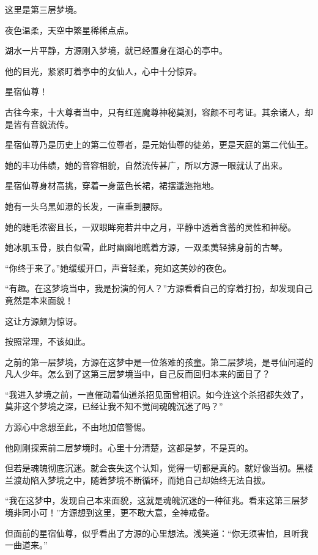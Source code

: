 
\begin{this_body}

这里是第三层梦境。

夜色温柔，天空中繁星稀稀点点。

湖水一片平静，方源刚入梦境，就已经置身在湖心的亭中。

他的目光，紧紧盯着亭中的女仙人，心中十分惊异。

星宿仙尊！

古往今来，十大尊者当中，只有红莲魔尊神秘莫测，容颜不可考证。其余诸人，却是皆有音貌流传。

星宿仙尊乃是历史上的第二位尊者，是元始仙尊的徒弟，更是天庭的第二代仙王。

她的丰功伟绩，她的音容相貌，自然流传甚广，所以方源一眼就认了出来。

星宿仙尊身材高挑，穿着一身蓝色长裙，裙摆逶迤拖地。

她有一头乌黑如瀑的长发，一直垂到腰际。

她的睫毛浓密且长，一双眼眸宛若井中之月，平静中透着含蓄的灵性和神秘。

她冰肌玉骨，肤白似雪，此时幽幽地瞧着方源，一双柔荑轻拂身前的古琴。

“你终于来了。”她缓缓开口，声音轻柔，宛如这美妙的夜色。

“有趣。在这梦境当中，我是扮演的何人？”方源看看自己的穿着打扮，却发现自己竟然是本来面貌！

这让方源颇为惊讶。

按照常理，不该如此。

之前的第一层梦境，方源在这梦中是一位落难的孩童。第二层梦境，是寻仙问道的凡人少年。怎么到了这第三层梦境当中，自己反而回归本来的面目了？

“我进入梦境之前，一直催动着仙道杀招见面曾相识。如今连这个杀招都失效了，莫非这个梦境之深，已经让我不知不觉间魂魄沉迷了吗？”

方源心中念想至此，不由地加倍警惕。

他刚刚探索前二层梦境时。心里十分清楚，这都是梦，不是真的。

但若是魂魄彻底沉迷。就会丧失这个认知，觉得一切都是真的。就好像当初。黑楼兰渡劫陷入梦境之中，随着梦境不断循环，而她自己却始终无法自拔。

“我在这梦中，发现自己本来面貌，这就是魂魄沉迷的一种征兆。看来这第三层梦境非同小可！”方源想到这里，更不敢大意，全神戒备。

但面前的星宿仙尊，似乎看出了方源的心里想法。浅笑道：“你无须害怕，且听我一曲道来。”


\end{this_body}
